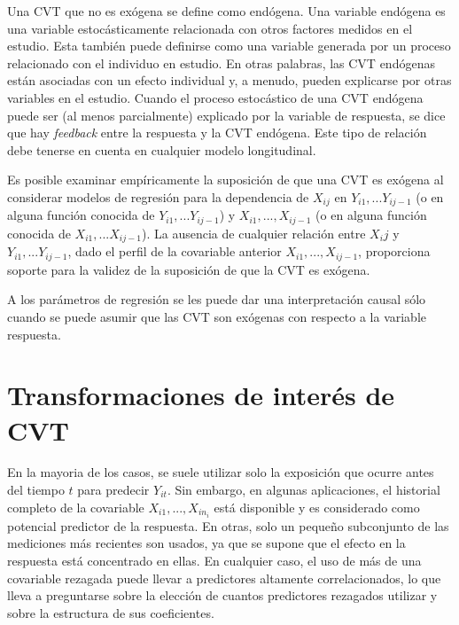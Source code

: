 \documentclass[spanish]{article}
\numberwithin{figure}{subsection}
\numberwithin{equation}{subsection}
\numberwithin{table}{subsection}
\def\xseqn{$X_{i1}, ..., X_{in_i}$}
\begin{document}
Una CVT que no es exógena se define como endógena. Una variable endógena es una
variable estocásticamente relacionada con otros factores medidos en el estudio.
Esta también puede definirse como una variable generada por un proceso
relacionado con el individuo en estudio. En otras palabras, las CVT endógenas
están asociadas con un efecto individual y, a menudo, pueden explicarse por
otras variables en el estudio. Cuando el proceso estocástico de una CVT
endógena puede ser (al menos parcialmente) explicado por la variable de
respuesta, se dice que hay \textit{feedback} entre la respuesta y la CVT
endógena. Este tipo de relación debe tenerse en cuenta en cualquier modelo
longitudinal.

Es posible examinar empíricamente la suposición de que una CVT es exógena al
considerar modelos de regresión para la dependencia de $X_{ij}$ en
$Y_{i1}, ... Y_{ij-1}$ (o en alguna función conocida de
$Y_{i1}, ... Y_{ij-1}$) y $X_{i1}, ..., X_{ij-1}$ (o en alguna función conocida
de $X_{i1}, ... X_{ij-1}$). La ausencia de cualquier relación entre $X_ij$ y
$Y_{i1}, ... Y_{ij-1}$, dado el perfil de la covariable anterior
$X_{i1}, ..., X_{ij-1}$, proporciona soporte para la validez de la suposición
de que la CVT es exógena.

A los parámetros de regresión se les puede dar una interpretación causal sólo
cuando se puede asumir que las CVT son exógenas con respecto a la variable
respuesta.

\section{Transformaciones de interés de CVT}

En la mayoria de los casos, se suele utilizar solo la exposición que ocurre
antes del tiempo $t$ para predecir $Y_{it}$. Sin embargo, en algunas
aplicaciones, el historial completo de la covariable \xseqn{} está disponible y
es considerado como potencial predictor de la respuesta. En otras, solo un
pequeño subconjunto de las mediciones más recientes son usados, ya que se
supone que el efecto en la respuesta está concentrado en ellas. En cualquier
caso, el uso de más de una covariable rezagada puede llevar a predictores
altamente correlacionados, lo que lleva a preguntarse sobre la elección de
cuantos predictores rezagados utilizar y sobre la estructura de sus
coeficientes.

\end{document}
